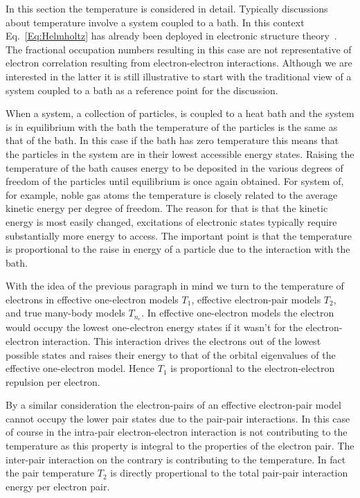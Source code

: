 \documentclass[pra]{revtex4-1}
\begin{document}
In this section the temperature is considered in detail. Typically discussions
about temperature involve a system coupled to a bath. In this context 
Eq.~\ref{Eq:Helmholtz} has already been deployed in electronic structure
theory~\cite{Warren_1996,Weinert_1992,Gillan_1989,Mermin_1965}. The fractional
occupation numbers resulting in this case are not representative of electron
correlation resulting from electron-electron interactions. Although we are
interested in the latter it is still illustrative to start with the traditional
view of a system coupled to a bath as a reference point for the discussion.

When a system, a collection of particles, is coupled to a heat bath and the
system is in equilibrium with the bath the temperature of the particles
is the same as that of the bath. In this case if the bath has zero temperature
this means that the particles in the system are in their lowest accessible
energy states. Raising the temperature of the bath causes energy to be deposited
in the various degrees of freedom of the particles until equilibrium is once
again obtained. For system of, for example, noble gas atoms the temperature
is closely related to the average kinetic energy per degree of freedom. The
reason for that is that the kinetic energy is most easily changed, excitations
of electronic states typically require substantially more energy to access.
The important point is that the temperature is proportional to the raise in
energy of a particle due to the interaction with the bath.

With the idea of the previous paragraph in mind we turn to the temperature
of electrons in effective one-electron models $T_1$, effective electron-pair
models $T_2$, and true many-body models $T_{n_e}$. In effective one-electron
models the electron would occupy the lowest one-electron energy states if it
wasn't for the electron-electron interaction. This interaction drives the
electrons out of the lowest possible states and raises their energy to that
of the orbital eigenvalues of the effective one-electron model. Hence $T_1$ is
proportional to the electron-electron repulsion per electron.

By a similar consideration the electron-pairs of an effective electron-pair
model cannot occupy the lower pair states due to the pair-pair interactions. In
this case of course in the intra-pair electron-electron interaction is not
contributing to the temperature as this property is integral to the properties
of the electron pair. The inter-pair interaction on the contrary is contributing
to the temperature. In fact the pair temperature $T_2$ is directly propertional
to the total pair-pair interaction energy per electron pair.  
\end{document}

